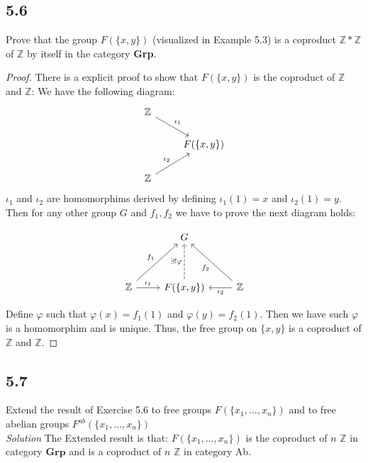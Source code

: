 \documentclass[a4paper, pdf, 12pt]{article}
\begin{document}
\subsection*{5.6}
Prove that the group $F(\{x, y\})$ (visualized in Example 5.3) is a coproduct
$\mathbb{Z} * \mathbb{Z}$ of $\mathbb{Z}$ by itself in the category \textbf{Grp}.

\begin{proof}
  There is a explicit proof to show that $F(\{x, y\})$ is the coproduct of $\mathbb{Z}$ and $\mathbb{Z}$:
  We have the following diagram:
  $$
    \begin{tikzcd}
      \mathbb{Z} \ar[rd, "\iota_{1}"] & \\
      & F(\{x, y\}) \\
      \mathbb{Z} \ar[ru, "\iota_{2}"]
    \end{tikzcd}
  $$
  $\iota_1$ and $\iota_2$ are homomorphims derived by defining $\iota_1(1) = x$ and $\iota_2(1) = y$.
  Then for any other group $G$ and $f_1, f_2$ we have to prove the next diagram holds:
  \begin{center}
    $$
      \begin{tikzcd}[row sep=huge]
        & G &  \\
        \mathbb{Z} \ar[ru, "f_1"] \ar[r, "\iota_{1}"] & F(\{x, y\}) \ar[u, dashed, "\exists!\varphi"]& \ar[lu, "f_2"] \ar[l, "\iota_{2}"] \mathbb{Z}
      \end{tikzcd}
    $$
  \end{center}
  Define $\varphi$ such that $\varphi(x) = f_1(1)$ and $\varphi(y) = f_2(1)$. Then we have such
  $\varphi$ is a homomorphim and is unique. Thus, the free group on $\{x, y\}$ is a coproduct of $\mathbb{Z}$ and $\mathbb{Z}$.
\end{proof}

\subsection*{5.7}
Extend the result of Exercise 5.6 to free groups $F(\{x_1,\ldots, x_n\})$ and to free
abelian groups $F^{ab}(\{x_1,\ldots, x_n\})$\\

\noindent
\textit{Solution}
The Extended result is that: $F(\{x_1,\ldots, x_n\})$ is the coproduct of $n$ $\mathbb{Z}$ in category $\mathbf{Grp}$ and is
a coproduct of $n$ $\mathbb{Z}$ in category Ab.
\end{document}

